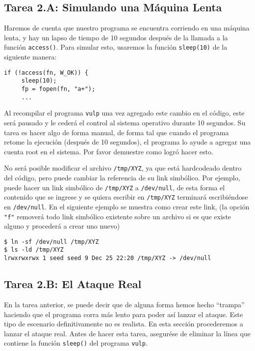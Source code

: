 \subsection{Tarea 2.A: Simulando una Máquina Lenta} 

Haremos de cuenta que nuestro programa se encuentra corriendo en una máquina lenta, y hay un lapso de tiempo de 10 segundos después de la llamada a la función \texttt{access()}. Para simular esto, usaremos la función \texttt{sleep(10)} de la siguiente manera:

\begin{lstlisting}
if (!access(fn, W_OK)) {
     sleep(10);
     fp = fopen(fn, "a+");
     ...
\end{lstlisting}
 
Al recompilar el programa \texttt{vulp} una vez agregado este cambio en el código, este será pausado y le cederá el control al sistema operativo durante 10 segundos.
Su tarea es hacer algo de forma manual, de forma tal que cuando el programa retome la ejecución (después de 10 segundos), el programa lo ayude a agregar una cuenta root en el sistema. Por favor demuestre como logró hacer esto.

No será posible modificar el archivo \texttt{/tmp/XYZ}, ya que está hardcodeado dentro del código, pero puede cambiar la referencia de su link simbólico. Por ejemplo, puede hacer un link simbólico de \texttt{/tmp/XYZ} a \texttt{/dev/null}, de esta forma el contenido que se ingrese y se quiera escribir en \texttt{/tmp/XYZ} terminará escribiéndose en \texttt{/dev/null}. En el siguiente ejemplo se muestra como crear este link, (la opción \texttt{"f"} removerá todo link simbólico existente sobre un archivo si es que existe alguno y procederá a crear uno nuevo)


\begin{lstlisting}
$ ln -sf /dev/null /tmp/XYZ
$ ls -ld /tmp/XYZ
lrwxrwxrwx 1 seed seed 9 Dec 25 22:20 /tmp/XYZ -> /dev/null
\end{lstlisting}
 
\subsection{Tarea 2.B: El Ataque Real}

En la tarea anterior, se puede decir que de alguna forma hemos hecho ``trampa'' haciendo que el programa corra más lento para poder así lanzar el ataque. Este tipo de escenario definitivamente no es realista. En esta sección procederemos a lanzar el ataque real.
Antes de hacer esta tarea, asegurése de eliminar la línea que contiene la función  \texttt{sleep()} del programa \texttt{vulp}.

